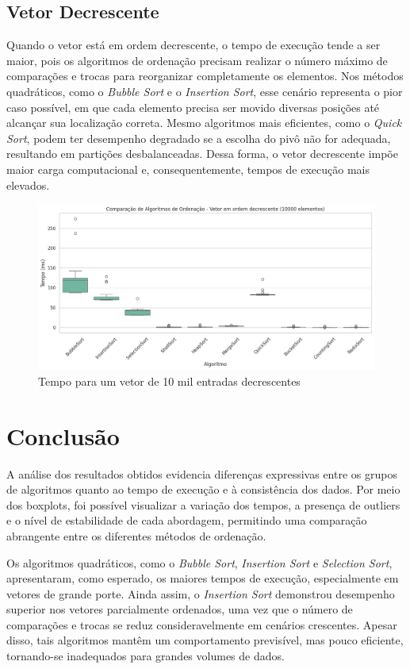 \documentclass[
	article,			%
	11pt,				%
	oneside,			%
	a4paper,			%
	english,			%
	brazil,				%
	sumario=tradicional
	]{abntex2}
\begin{document}
\subsection{Vetor Decrescente}

Quando o vetor está em ordem decrescente, o tempo de execução tende a ser maior, pois os algoritmos de ordenação precisam realizar o número máximo de comparações e trocas para reorganizar completamente os elementos. Nos métodos quadráticos, como o \textit{Bubble Sort} e o \textit{Insertion Sort}, esse cenário representa o pior caso possível, em que cada elemento precisa ser movido diversas posições até alcançar sua localização correta. Mesmo algoritmos mais eficientes, como o \textit{Quick Sort}, podem ter desempenho degradado se a escolha do pivô não for adequada, resultando em partições desbalanceadas. Dessa forma, o vetor decrescente impõe maior carga computacional e, consequentemente, tempos de execução mais elevados.

\begin{figure}[h!]
    \centering
    \includegraphics[width=1\linewidth]{Decrescente.png}
    \caption{Tempo para um vetor de 10 mil entradas decrescentes}
    \label{fig:placeholder}
\end{figure}

\newpage
\section{Conclusão}
A análise dos resultados obtidos evidencia diferenças expressivas entre os grupos de algoritmos quanto ao tempo de execução e à consistência dos dados. Por meio dos boxplots, foi possível visualizar a variação dos tempos, a presença de outliers e o nível de estabilidade de cada abordagem, permitindo uma comparação abrangente entre os diferentes métodos de ordenação.

Os algoritmos quadráticos, como o \textit{Bubble Sort}, \textit{Insertion Sort} e \textit{Selection Sort}, apresentaram, como esperado, os maiores tempos de execução, especialmente em vetores de grande porte. Ainda assim, o \textit{Insertion Sort} demonstrou desempenho superior nos vetores parcialmente ordenados, uma vez que o número de comparações e trocas se reduz consideravelmente em cenários crescentes. Apesar disso, tais algoritmos mantêm um comportamento previsível, mas pouco eficiente, tornando-se inadequados para grandes volumes de dados.
\end{document}
